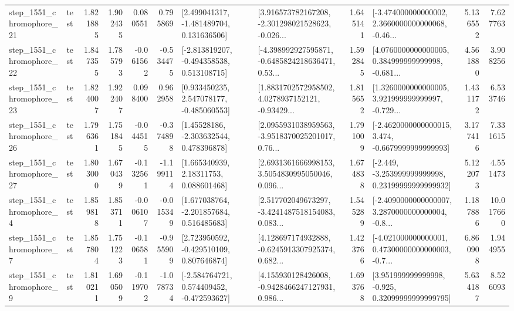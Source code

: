 \begin{tabular}{llrrrrllrlrr}
 step\_1551\_chromophore\_21 &      test &      1.821885 &    1.902435 &      0.080551 &  0.795869 &    [2.499041317, -1.481489704, 0.131636506] &  [3.916573782167208, -2.301298021528623, -0.026... &       1.645141 &  [-3.474000000000002, 2.3660000000000068, -0.46... &            5.136552 &          7.627763 \\
 step\_1551\_chromophore\_22 &      test &      1.847355 &    1.785793 &     -0.061562 & -0.534475 &   [-2.813819207, -0.494358538, 0.513108715] &  [-4.398992927595871, -0.6485824218636471, 0.53... &       1.592845 &  [4.0760000000000005, 0.384999999999998, -0.681... &            4.561880 &          3.908256 \\
 step\_1551\_chromophore\_23 &      test &      1.824007 &    1.922407 &      0.098400 &  0.962958 &    [0.933450235, 2.547078177, -0.485060553] &  [1.8831702572958502, 4.0278937152121, -0.93429... &       1.815652 &  [1.3260000000000005, 3.921999999999997, -0.729... &            1.431172 &          6.533746 \\
 step\_1551\_chromophore\_26 &      test &      1.796361 &    1.751845 &     -0.044515 & -0.374898 &     [1.45528186, -2.303632544, 0.478396878] &  [2.0955931038959563, -3.9518370025201017, 0.76... &       1.791009 &  [-2.4620000000000015, 3.474, -0.6679999999999993] &            3.177416 &          7.331615 \\
 step\_1551\_chromophore\_27 &      test &      1.803000 &    1.670439 &     -0.132561 & -1.199114 &      [1.665340939, 2.18311753, 0.088601468] &  [2.6931361666998153, 3.5054830995050046, 0.096... &       1.674838 &  [-2.449, -3.253999999999998, 0.23199999999999932] &            5.122073 &          4.551473 \\
  step\_1551\_chromophore\_4 &      test &      1.859818 &    1.853711 &     -0.006107 & -0.015349 &    [1.677038764, -2.201857684, 0.516485683] &  [2.517702049673297, -3.4241487518154083, 0.083... &       1.545289 &  [-2.4090000000000007, 3.2870000000000004, -0.8... &            1.187886 &         10.017660 \\
  step\_1551\_chromophore\_7 &      test &      1.857804 &    1.751223 &     -0.106581 & -0.955909 &    [2.723950592, -0.429510109, 0.807646874] &  [4.128697174932888, -0.6245913307925374, 0.682... &       1.423766 &  [-4.021000000000001, 0.47300000000000003, -0.7... &            6.860908 &          1.944955 \\
  step\_1551\_chromophore\_9 &      test &      1.810211 &    1.690509 &     -0.119702 & -1.078734 &   [-2.584764721, 0.574409452, -0.472593627] &  [4.155930128426008, -0.9428466247127931, 0.986... &       1.693768 &   [3.951999999999998, -0.925, 0.32099999999999795] &            5.634187 &          8.526093 \\

\end{tabular}
